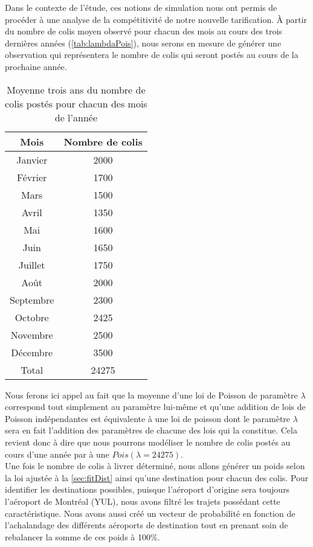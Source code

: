 Dans le contexte de l'étude, ces notions de simulation nous ont permis de procéder à une analyse de la compétitivité de notre nouvelle tarification. À partir du nombre de colis moyen observé pour chacun des mois au cours des trois dernières années (\autoref{tab:lambdaPois}), nous serons en mesure de générer une observation qui représentera le nombre de colis qui seront postés au cours de la prochaine année. \\

\begin{table}
	\centering
	\begin{tabular}{cc}
		Mois & Nombre de colis \\
		\hline
		Janvier & 2000 \\
		Février & 1700 \\
		Mars & 1500 \\
		Avril & 1350 \\
		Mai & 1600 \\
		Juin & 1650 \\
		Juillet & 1750 \\
		Août & 2000 \\
		Septembre & 2300 \\
		Octobre & 2425 \\
		Novembre & 2500 \\
		Décembre & 3500 \\
		\hline
		Total & 24275
	\end{tabular}
	\caption{Moyenne trois ans du nombre de colis postés pour chacun des mois de l'année}
	\label{tab:lambdaPois}
\end{table}

Nous ferons ici appel au fait que la moyenne d'une loi de Poisson de paramètre $\lambda$ correspond tout simplement au paramètre lui-même et qu'une addition de lois de Poisson indépendantes est équivalente à une loi de poisson dont le paramètre $\lambda$ sera en fait l'addition des paramètres de chacune des lois qui la constitue. Cela revient donc à dire que nous pourrons modéliser le nombre de colis postés au cours d'une année par à une $Pois(\lambda = 24275)$. \\

Une fois le nombre de colis à livrer déterminé, nous allons générer un poids selon la loi ajustée à la \autoref{sec:fitDist} ainsi qu'une destination pour chacun des colis. Pour identifier les destinations possibles, puisque l'aéroport d'origine sera toujours l'aéroport de Montréal (YUL), nous avons filtré les trajets possédant cette caractéristique. Nous avons aussi créé un vecteur de probabilité en fonction de l'achalandage des différents aéroports de destination tout en prenant soin de rebalancer  la somme de ces poids à 100\%. \\


